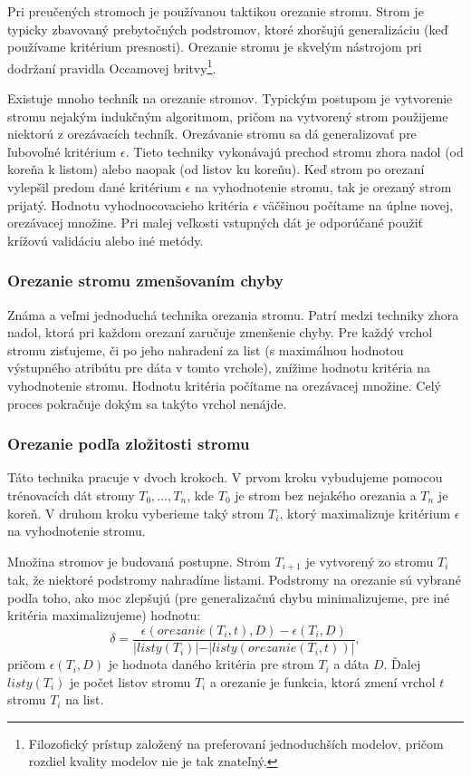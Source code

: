 Pri preučených stromoch je používanou taktikou orezanie stromu. Strom je typicky zbavovaný prebytočných podstromov, ktoré zhoršujú generalizáciu (keď používame kritérium presnosti). Orezanie stromu je skvelým nástrojom pri dodržaní pravidla Occamovej britvy\footnote{Filozofický prístup založený na preferovaní jednoduchších modelov, pričom rozdiel kvality modelov nie je tak znateľný.}.

Existuje mnoho techník na orezanie stromov. Typickým postupom je vytvorenie stromu nejakým indukčným algoritmom, pričom na vytvorený strom použijeme niektorú z orezávacích techník.
Orezávanie stromu sa dá generalizovať pre ľubovoľné kritérium $\epsilon$.
Tieto techniky vykonávajú prechod stromu zhora nadol (od koreňa k listom) alebo naopak (od listov ku koreňu). Keď strom po orezaní vylepšil predom dané kritérium $\epsilon$ na vyhodnotenie stromu, tak je orezaný strom prijatý.
Hodnotu vyhodnocovacieho kritéria $\epsilon$ väčšinou počítame na úplne novej, orezávacej množine. Pri malej veľkosti vstupných dát je odporúčané použiť krížovú validáciu alebo iné metódy.
\subsubsection{Orezanie stromu zmenšovaním chyby}
Známa a veľmi jednoduchá technika orezania stromu. Patrí medzi techniky zhora nadol, ktorá pri každom orezaní zaručuje zmenšenie chyby. Pre každý vrchol stromu zisťujeme, či po jeho nahradení za list (s maximálnou hodnotou výstupného atribútu pre dáta v tomto vrchole), znížime hodnotu kritéria na vyhodnotenie stromu. Hodnotu kritéria počítame na orezávacej množine. Celý proces pokračuje dokým sa takýto vrchol nenájde.
\subsubsection{Orezanie podľa zložitosti stromu}
Táto technika pracuje v dvoch krokoch. V prvom kroku vybudujeme pomocou trénovacích dát stromy $T_{0},\ldots,T_{n}$, kde $T_{0}$ je strom bez nejakého orezania a $T_{n}$ je koreň. V druhom kroku vyberieme taký strom $T_{i}$, ktorý maximalizuje kritérium $\epsilon$ na vyhodnotenie stromu. 

Množina stromov je budovaná postupne. Strom $T_{i+1}$ je vytvorený zo stromu $T_{i}$ tak, že niektoré podstromy nahradíme listami. Podstromy na orezanie sú vybrané podľa toho, ako moc zlepšujú (pre generalizačnú chybu minimalizujeme, pre iné kritéria maximalizujeme) hodnotu:
\begin{equation}
\delta = \dfrac{\epsilon(orezanie(T_{i},t),D) - \epsilon(T_{i},D)}{\lvert listy(T_{i}) \lvert - \lvert listy(orezanie(T_{i},t)) \lvert}, \nonumber
\end{equation}
pričom $\epsilon(T_{i},D)$ je hodnota daného kritéria pre strom $T_{i}$ a dáta $D$. Ďalej $listy(T_{i})$ je počet listov stromu $T_{i}$ a orezanie je funkcia, ktorá zmení vrchol $t$ stromu $T_{i}$ na list.

